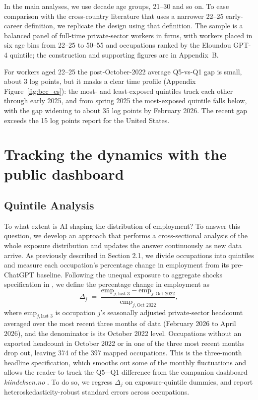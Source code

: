 \documentclass[12pt]{article}
\begin{document}
In the main analyses, we use decade age groups, 21--30 and so on. To ease comparison with the cross-country literature that uses a narrower 22--25 early-career definition, we replicate the \citet{brynjolfsson2025} design using that definition. The sample is a balanced panel of full-time private-sector workers in firms, with workers placed in six age bins from 22--25 to 50--55 and occupations ranked by the Eloundou GPT-4 quintile; the construction and supporting figures are in Appendix~B.

For workers aged 22--25 the post-October-2022 average Q5-vs-Q1 gap is small, about 3 log points, but it masks a clear time profile (Appendix Figure~\ref{fig:bcc_es}): the most- and least-exposed quintiles track each other through early 2025, and from spring 2025 the most-exposed quintile falls below, with the gap widening to about 35 log points by February 2026. The recent gap exceeds the 15 log points \citet{brynjolfsson2025} report for the United States.


\section{Tracking the dynamics with the public dashboard}\label{sec:tracking:dashboard}

\subsection{Quintile Analysis}\label{sec:regression:quintile}

To what extent is AI shaping the distribution of employment? To answer this question, we develop an approach that performs a cross-sectional analysis of the whole exposure distribution and updates the answer continuously as new data arrive. As previously described in Section 2.1, we divide occupations into quintiles and measure each occupation's percentage change in employment from its pre-ChatGPT baseline. Following the unequal exposure to aggregate shocks specification in \cite{yagan2019}, we define the percentage change in employment as
\[
\Delta_j \;=\; \frac{\text{emp}_{j,\text{last 3}} - \text{emp}_{j,\text{Oct }2022}}{\text{emp}_{j,\text{Oct }2022}},
\]
where $\text{emp}_{j,\text{last 3}}$ is occupation $j$'s seasonally adjusted private-sector headcount averaged over the most recent three months of data (February 2026 to April 2026), and the denominator is its October 2022 level. Occupations without an exported headcount in October 2022 or in one of the three most recent months drop out, leaving 374 of the 397 mapped occupations. This is the three-month headline specification, which smooths out some of the monthly fluctuations and allows the reader to track the Q5$-$Q1 difference from the companion dashboard \textit{kiindeksen.no} \citep{kiindeksen2026}. To do so, we regress $\Delta_j$ on exposure-quintile dummies, and report heteroskedasticity-robust standard errors across occupations.
\end{document}
